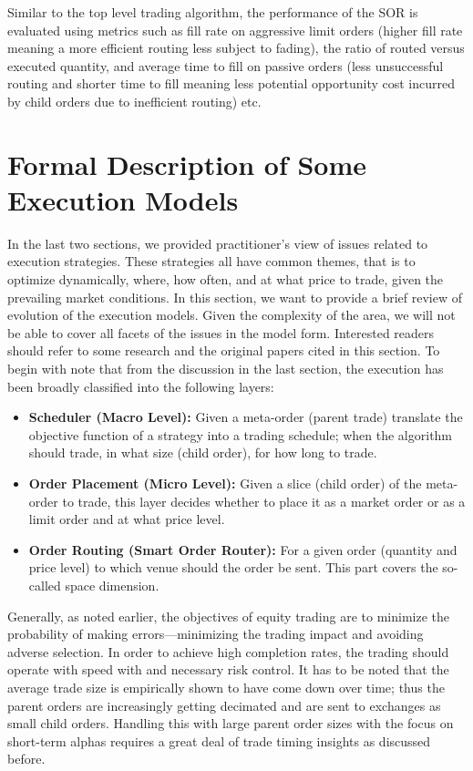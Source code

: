 Similar to the top level trading algorithm, the performance of the SOR is evaluated using metrics such as fill rate on aggressive limit orders (higher fill rate meaning a more efficient routing less subject to fading), the ratio of routed versus executed quantity, and average time to fill on passive orders (less unsuccessful routing and shorter time to fill meaning less potential opportunity cost incurred by child orders due to inefficient routing) etc.



\section{Formal Description of Some Execution Models}

In the last two sections, we provided practitioner's view of issues related to execution strategies. These strategies all have common themes, that is to optimize dynamically, where, how often, and at what price to trade, given the prevailing market conditions. In this section, we want to provide a brief review of evolution of the execution models. Given the complexity of the area, we will not be able to cover all facets of the issues in the model form. Interested readers should refer to some research and the original papers cited in this section. To begin with note that from the discussion in the last section, the execution has been broadly classified into the following layers:

	\begin{itemize}
	\item \textbf{Scheduler (Macro Level):} Given a meta-order (parent trade) translate the objective function of a strategy into a trading schedule; when the algorithm should trade, in what size (child order), for how long to trade.
	
	\item \textbf{Order Placement (Micro Level):} Given a slice (child order) of the meta-order to trade, this layer decides whether to place it as a market order or as a  limit order and at what price level.
	
	\item \textbf{Order Routing (Smart Order Router):} For a given order (quantity and price level) to which venue should the order be sent. This part covers the so-called space dimension.
	\end{itemize}


Generally, as noted earlier, the objectives of equity trading are to minimize the probability of making errors---minimizing the trading impact and avoiding adverse selection. In order to achieve high completion rates, the trading should operate with speed with and necessary risk control. It has to be noted that the average trade size is empirically shown to have come down over time; thus the parent orders are increasingly getting decimated and are sent to exchanges as small child orders. Handling this with large parent order sizes with the focus on short-term alphas requires a great deal of trade timing insights as discussed before.


